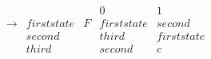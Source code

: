 \documentclass{standalone}
\begin{document}
\[
\begin{array}{rll|ll}
  &&&0&1\\\hline
  \to&firststate&F&firststate&second\\
  &second&&third&firststate\\
  &third&&second&c\\
\end{array}
\]
\end{document}
